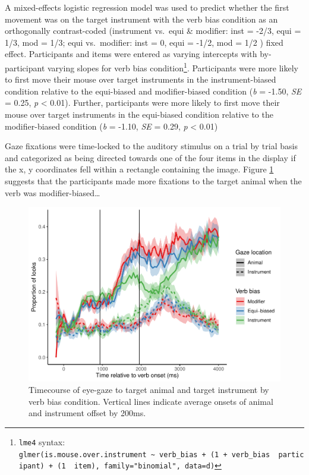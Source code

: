 \documentclass[
  english,
  man,floatsintext]{apa6}
\begin{document}
A mixed-effects logistic regression model was used to predict whether the first movement was on the target instrument with the verb bias condition as an orthogonally contrast-coded (instrument vs.~equi \& modifier: inst = -2/3, equi = 1/3, mod = 1/3; equi vs.~modifier: inst = 0, equi = -1/2, mod = 1/2 ) fixed effect. Participants and items were entered as varying intercepts with by-participant varying slopes for verb bias condition\footnote{\texttt{lme4} syntax: \texttt{glmer(is.mouse.over.instrument\ \textasciitilde{}\ verb\_bias\ +\ (1\ +\ verb\_bias\ \textbar{}\ participant)\ +\ (1\ \textbar{}\ item),\ family="binomial",\ data=d)}}. Participants were more likely to first move their mouse over target instruments in the instrument-biased condition relative to the equi-biased and modifier-biased condition (\emph{b} = -1.50, \emph{SE} = 0.25, \emph{p} \textless{} 0.01). Further, participants were more likely to first move their mouse over target instruments in the equi-biased condition relative to the modifier-biased condition (\emph{b} = -1.10, \emph{SE} = 0.29, \emph{p} \textless{} 0.01)

Gaze fixations were time-locked to the auditory stimulus on a trial by trial basis and categorized as being directed towards one of the four items in the display if the x, y coordinates fell within a rectangle containing the image. Figure \ref{fig:E4-gaze-timecourse-fig} suggests that the participants made more fixations to the target animal when the verb was modifier-biased\ldots{}

\begin{figure}
\centering
\includegraphics{manuscript_files/figure-latex/E4-gaze-timecourse-fig-1.pdf}
\caption{\label{fig:E4-gaze-timecourse-fig}Timecourse of eye-gaze to target animal and target instrument by verb bias condition. Vertical lines indicate average onsets of animal and instrument offset by 200ms.}
\end{figure}
\end{document}
